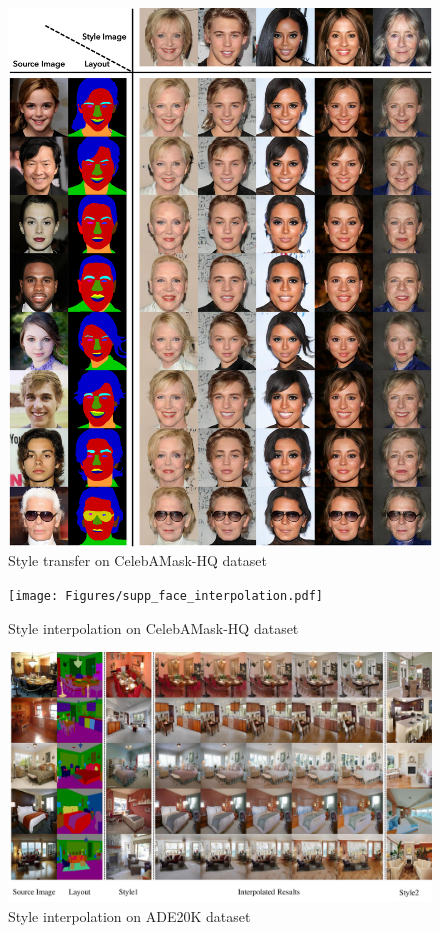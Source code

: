 \documentclass[10pt,twocolumn,letterpaper]{article}
\begin{document}
\begin{figure}[th]
\centering
\includegraphics[width=\linewidth]{Figures/Teaser_jpg.pdf}
\caption{Style transfer on CelebAMask-HQ dataset}
\label{fig:additional style transfer}
\end{figure}


\begin{figure}[th]
\centering
\texttt{[image: Figures/supp\_face\_interpolation.pdf]}
\caption{Style interpolation on CelebAMask-HQ dataset}
\label{fig:Supp face interpolation}
\end{figure}

\begin{figure}[th]
\centering
\includegraphics[width=\linewidth]{Figures/supp_ADE_interpolation_jpg.pdf}
\caption{Style interpolation on ADE20K dataset}
\label{fig:Supp ADE interpolation}
\end{figure}









\clearpage


{\small


}
\end{document}

